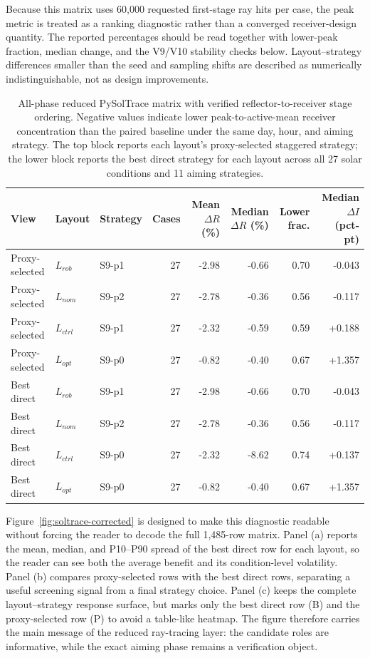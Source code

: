 \documentclass[final,3p,times]{elsarticle}
\begin{document}
Because this matrix uses 60,000 requested first-stage ray hits per case, the peak metric is treated as a ranking diagnostic rather than a converged receiver-design quantity. The reported percentages should be read together with lower-peak fraction, median change, and the V9/V10 stability checks below. Layout--strategy differences smaller than the seed and sampling shifts are described as numerically indistinguishable, not as design improvements.

\begin{table}[H]
\centering
\caption{All-phase reduced PySolTrace matrix with verified reflector-to-receiver stage ordering. Negative values indicate lower peak-to-active-mean receiver concentration than the paired baseline under the same day, hour, and aiming strategy. The top block reports each layout's proxy-selected staggered strategy; the lower block reports the best direct strategy for each layout across all 27 solar conditions and 11 aiming strategies.}
\label{tab:soltrace-corrected}
\tiny
\begin{tabular*}{\textwidth}{@{\extracolsep{\fill}}lllrrrrr@{}}
\toprule
View & Layout & Strategy & Cases & Mean $\Delta R$ (\%) & Median $\Delta R$ (\%) & Lower frac. & Median $\Delta I$ (pct-pt) \\
\midrule
Proxy-selected & $L_{rob}$ & S9-p1 & 27 & -2.98 & -0.66 & 0.70 & -0.043 \\
Proxy-selected & $L_{nom}$ & S9-p2 & 27 & -2.78 & -0.36 & 0.56 & -0.117 \\
Proxy-selected & $L_{ctrl}$ & S9-p1 & 27 & -2.32 & -0.59 & 0.59 & +0.188 \\
Proxy-selected & $L_{opt}$ & S9-p0 & 27 & -0.82 & -0.40 & 0.67 & +1.357 \\
\midrule
Best direct & $L_{rob}$ & S9-p1 & 27 & -2.98 & -0.66 & 0.70 & -0.043 \\
Best direct & $L_{nom}$ & S9-p2 & 27 & -2.78 & -0.36 & 0.56 & -0.117 \\
Best direct & $L_{ctrl}$ & S9-p0 & 27 & -2.32 & -8.62 & 0.74 & +0.137 \\
Best direct & $L_{opt}$ & S9-p0 & 27 & -0.82 & -0.40 & 0.67 & +1.357 \\
\bottomrule
\end{tabular*}
\end{table}

Figure~\ref{fig:soltrace-corrected} is designed to make this diagnostic readable without forcing the reader to decode the full 1,485-row matrix. Panel (a) reports the mean, median, and P10--P90 spread of the best direct row for each layout, so the reader can see both the average benefit and its condition-level volatility. Panel (b) compares proxy-selected rows with the best direct rows, separating a useful screening signal from a final strategy choice. Panel (c) keeps the complete layout--strategy response surface, but marks only the best direct row (B) and the proxy-selected row (P) to avoid a table-like heatmap. The figure therefore carries the main message of the reduced ray-tracing layer: the candidate roles are informative, while the exact aiming phase remains a verification object.
\end{document}
